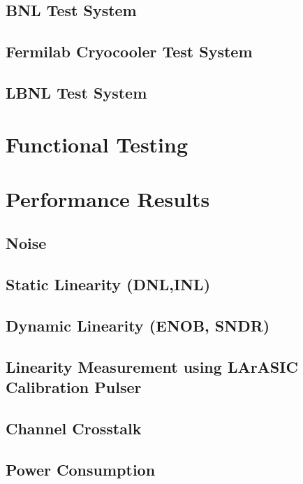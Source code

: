 \documentclass[10pt]{article}
\begin{document}
\subsection{BNL Test System }

\clearpage
\newpage
\subsection{Fermilab Cryocooler Test System }

\subsection{LBNL Test System }


\clearpage
\newpage
\section{Functional Testing }

	
\newpage
\section{Performance Results}


\subsection{Noise}


\clearpage
\newpage
\subsection{Static Linearity (DNL,INL)}

\subsection{Dynamic Linearity (ENOB, SNDR)}

\clearpage
\newpage
\subsection{Linearity Measurement using LArASIC Calibration Pulser}

\subsection{Channel Crosstalk }

\clearpage
\newpage
\subsection{Power Consumption }

\end{document}
